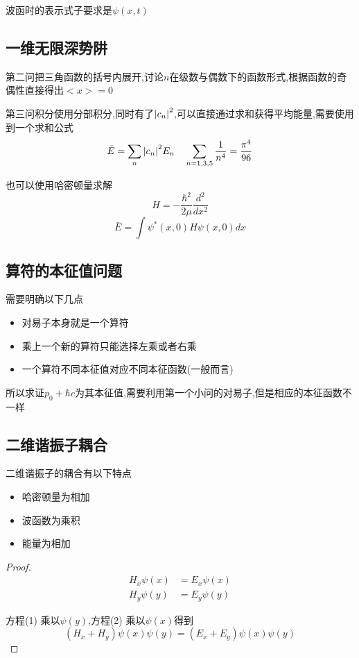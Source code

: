 \documentclass{article}
\begin{document}
            波函时的表示式子要求是$\psi(x,t)$
        
        \subsection{一维无限深势阱}
            第二问把三角函数的括号内展开,讨论$n$在级数与偶数下的函数形式,根据函数的奇偶性直接得出$ < x > = 0 $

            第三问积分使用分部积分,同时有了$\abs{c_{n}}^{2}$,可以直接通过求和获得平均能量,需要使用到一个求和公式
            $$ \bar{E} = \sum_{n} \abs{c_{n}}^{2} E_{n} \quad \sum_{n=1,3,5} \frac{1}{n^{4}} = \frac{\pi^{4}}{96} $$

            也可以使用哈密顿量求解
            $$ H = - \frac{\hbar^{2}}{2\mu} \frac{d^2}{dx^{2}} $$
            $$ \bar{E} = \int \psi^{*}(x,0) H \psi(x,0) dx $$

        \subsection{算符的本征值问题}
            需要明确以下几点
            \begin{itemize}
                \item 对易子本身就是一个算符
                \item 乘上一个新的算符只能选择左乘或者右乘
                \item 一个算符不同本征值对应不同本征函数(一般而言)
            \end{itemize}
            
            所以求证$ p_{0}+\hbar c $为其本征值,需要利用第一个小问的对易子,但是相应的本征函数不一样

        \subsection{二维谐振子耦合}
            二维谐振子的耦合有以下特点
            \begin{itemize}
                \item 哈密顿量为相加    
                \item 波函数为乘积
                \item 能量为相加
            \end{itemize}

            \begin{proof}
                \pfindent

                \begin{align}
                    H_{x} \psi(x) &= E_{x} \psi(x)  \tag{1} \\
                    H_{y} \psi(y) &= E_{y} \psi(y)  \tag{2}
                \end{align}
                
                方程(1) 乘以$\psi(y)$,方程(2) 乘以$\psi(x)$得到
                $$ (H_{x}+H_{y}) \psi(x)\psi(y) = (E_{x}+E_{y}) \psi(x)\psi(y) $$
            \end{proof}
\end{document}

